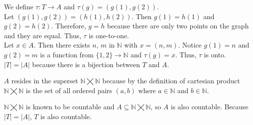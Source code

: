 \documentclass[11pt]{article}
\begin{document}
We define $\tau: T \rightarrow A$ and $\tau(g) = (g(1), g(2))$.\\[\baselineskip]

Let $(g(1), g(2)) = (h(1), h(2))$. Then $g(1) = h(1)$ and $g(2) = h(2)$. Therefore, $g = h$ because there are only two points on the graph and they are equal. Thus, $\tau$ is one-to-one.\\[\baselineskip]

Let $x \in A$. Then there exists $n$, $m$ in $\mathbb{N}$ with $x = (n, m)$. Notice $g(1) = n$ and $g(2) = m$ is a function from $\{1, 2\} \rightarrow \mathbb{N}$ and $\tau(g) = x$. Thus, $\tau$ is onto.\\[\baselineskip]

$|T| = |A|$ because there is a bijection between $T$ and $A$.

$A$ resides in the superset $\mathbb{N} \bigtimes \mathbb{N}$ because by the definition of cartesian product $\mathbb{N} \bigtimes \mathbb{N}$ is the set of all ordered pairs $(a, b)$ where $a \in \mathbb{N}$ and $b \in \mathbb{N}$.

$\mathbb{N} \bigtimes \mathbb{N}$ is known to be countable and $A \subseteq \mathbb{N} \bigtimes \mathbb{N}$, so $A$ is also countable. Because $|T| = |A|$, $T$ is also countable. 
\end{document}
